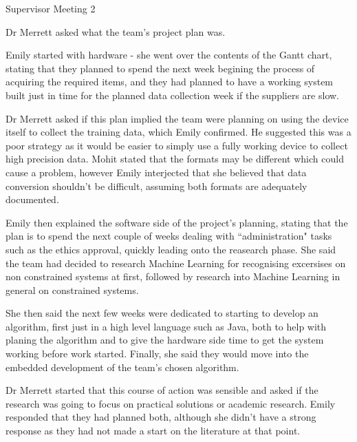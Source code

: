 \documentclass{article}
\begin{document}
\begin{Minutes}{Supervisor Meeting 2}

Dr Merrett asked what the team's project plan was.

Emily started with hardware - she went over the contents of the Gantt chart, stating that they
planned to spend the next week begining the process of acquiring the required items, and they
had planned to have a working system built just in time for the planned data collection week
if the suppliers are slow.

Dr Merrett asked if this plan implied the team were planning on using the
device itself to collect the training data, which Emily confirmed. He suggested this was a
poor strategy as it would be easier to simply use a fully working device to collect high
precision data. Mohit stated that the formats may be different which could cause a problem,
however Emily interjected that she believed that data conversion shouldn't be difficult,
assuming both formats are adequately documented.

Emily then explained the software side of the project's planning, stating that the plan is
to spend the next couple of weeks dealing with ``administration" tasks such as the ethics
approval, quickly leading onto the reasearch phase. She said the team had decided to research
Machine Learning for recognising excersises on non constrained systems at first, followed by
research into Machine Learning in general on constrained systems.

She then said the next few weeks were dedicated to starting to develop an algorithm, first
just in a high level language such as Java, both to help with planing the algorithm and to
give the hardware side time to get the system working before work started. Finally, she said
they would move into the embedded development of the team's chosen algorithm.

Dr Merrett started that this course of action was sensible and asked if the research was going
to focus on practical solutions or academic research. Emily responded that they had planned
both, although she didn't have a strong response as they had not made a start on the literature
at that point.




\end{Minutes}
\end{document}
